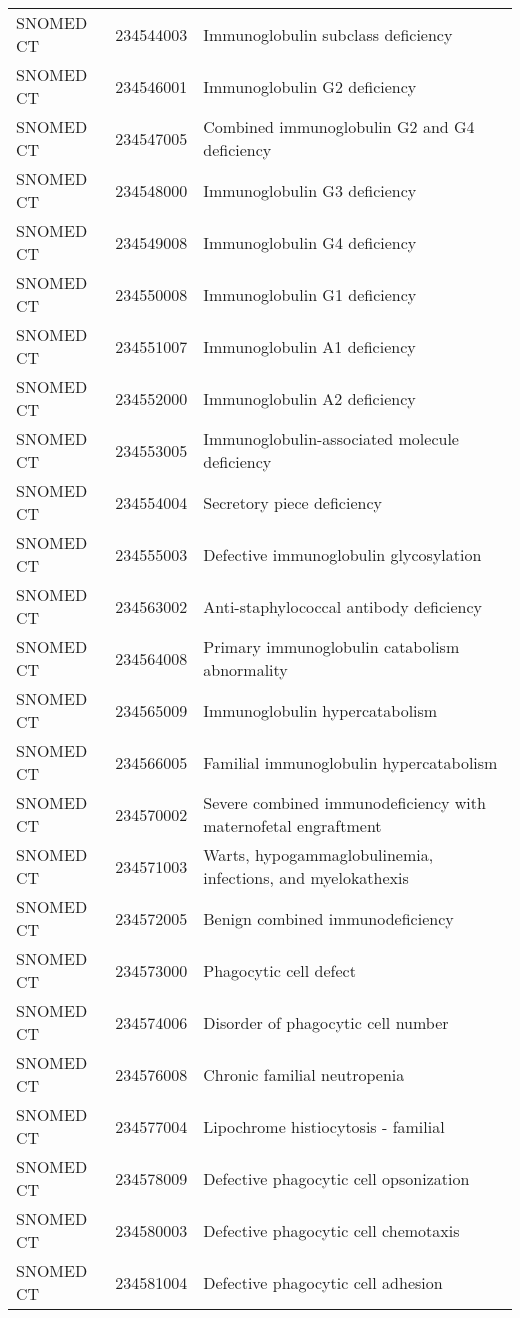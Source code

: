 \begin{longtable}{p{}p{}p{}}
  SNOMED CT & 234544003 & Immunoglobulin subclass deficiency \\ 
  SNOMED CT & 234546001 & Immunoglobulin G2 deficiency \\ 
  SNOMED CT & 234547005 & Combined immunoglobulin G2 and G4 deficiency \\ 
  SNOMED CT & 234548000 & Immunoglobulin G3 deficiency \\ 
  SNOMED CT & 234549008 & Immunoglobulin G4 deficiency \\ 
  SNOMED CT & 234550008 & Immunoglobulin G1 deficiency \\ 
  SNOMED CT & 234551007 & Immunoglobulin A1 deficiency \\ 
  SNOMED CT & 234552000 & Immunoglobulin A2 deficiency \\ 
  SNOMED CT & 234553005 & Immunoglobulin-associated molecule deficiency \\ 
  SNOMED CT & 234554004 & Secretory piece deficiency \\ 
  SNOMED CT & 234555003 & Defective immunoglobulin glycosylation \\ 
  SNOMED CT & 234563002 & Anti-staphylococcal antibody deficiency \\ 
  SNOMED CT & 234564008 & Primary immunoglobulin catabolism abnormality \\ 
  SNOMED CT & 234565009 & Immunoglobulin hypercatabolism \\ 
  SNOMED CT & 234566005 & Familial immunoglobulin hypercatabolism \\ 
  SNOMED CT & 234570002 & Severe combined immunodeficiency with maternofetal engraftment \\ 
  SNOMED CT & 234571003 & Warts, hypogammaglobulinemia, infections, and myelokathexis \\ 
  SNOMED CT & 234572005 & Benign combined immunodeficiency \\ 
  SNOMED CT & 234573000 & Phagocytic cell defect \\ 
  SNOMED CT & 234574006 & Disorder of phagocytic cell number \\ 
  SNOMED CT & 234576008 & Chronic familial neutropenia \\ 
  SNOMED CT & 234577004 & Lipochrome histiocytosis - familial \\ 
  SNOMED CT & 234578009 & Defective phagocytic cell opsonization \\ 
  SNOMED CT & 234580003 & Defective phagocytic cell chemotaxis \\ 
  SNOMED CT & 234581004 & Defective phagocytic cell adhesion \\ 

\end{longtable}
